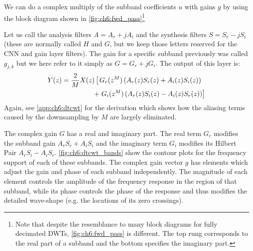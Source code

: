 We can do a complex multiply of the subband coefficients $u$ with gains $g$ by
using the block diagram shown in \autoref{fig:ch6:fwd_pass}\footnote{Note that despite the resemblance to many block
diagrams for fully decimated DWTs, \autoref{fig:ch6:fwd_pass} is different.
The top rung corresponds to the real part of a subband and the bottom specifies
the imaginary part.}

Let us call the analysis filters $A = A_r + jA_i$ and 
the synthesis filters $S = S_r - jS_i$ (these are normally called $H$ and
$G$, but we keep those letters reserved for the CNN and gain layer filters). The
gain for a specific subband previously was called $g_{j,k}$ but we here refer to
it simply as $G = G_r + jG_i$. The output of this layer is:
\begin{align}\label{eq:ch6:dtcwt_fwd}
  Y(z) = \frac{2}{M}X(z) \left[\vphantom{z^{M}} \right. &  G_r(z^{M}) \left(A_r(z)S_r(z) + A_i(z)S_i(z)\right) \nonumber \\
  +  & \left. G_i(z^{M}) \left( A_r(z)S_i(z) - A_i(z)S_r(z)\right) \right] 
\end{align}
Again, see \autoref{app:ch6:dtcwt} for the derivation which shows how the aliasing
terms caused by the downsampling by $M$ are largely eliminated. 

The complex gain $G$ has a real and imaginary part. The real term $G_r$ 
modifies the subband gain $A_rS_r + A_iS_i$ and the imaginary term $G_i$ modifies its
Hilbert Pair $A_rS_i - A_iS_r$. \autoref{fig:ch6:dtcwt_bands} show the contour
plots for the frequency support of each of these subbands. The complex gain
vector $g$ has elements which adjust the gain and phase of each subband
independently. The magnitude of each element controls the amplitude of the
frequency response in the region of that subband, while its phase controls the
phase of the response and thus modifies the detailed wave-shape (e.g. the
locations of its zero crossings).

\begin{figure}[t]
  \centering
  \hspace{1cm}
  \label{fig:ch6:dtcwt_bands}
\end{figure}

